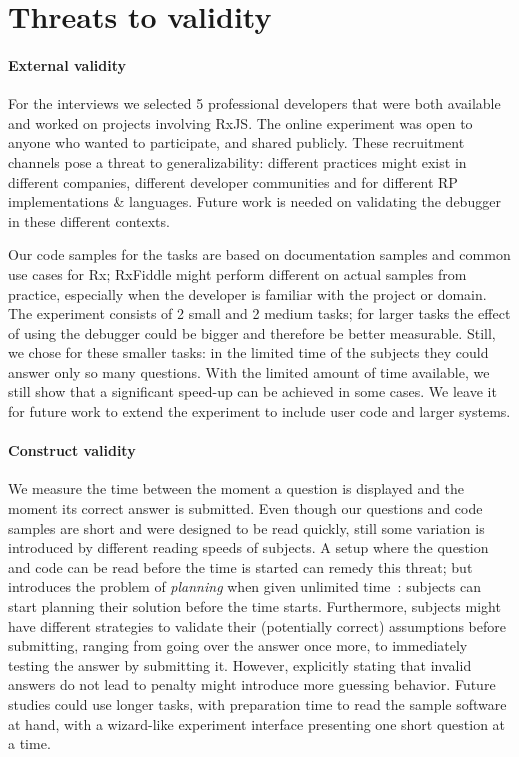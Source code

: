 \vspace{-2mm}
\section{Threats to validity}
\paragraph{External validity} For the interviews we selected 5
professional developers that were both available and worked on projects
involving RxJS.  The online experiment was open to anyone who wanted to
participate, and shared publicly.  These recruitment channels pose a
threat to generalizability:  different practices might exist in
different companies, different developer communities and for different
RP implementations \& languages.  Future work is needed on validating
the debugger in these different contexts.

Our code samples for the tasks are based on documentation samples and
common use cases for Rx; RxFiddle might perform different on actual
samples from practice, especially when the developer is familiar with
the project or domain.  The experiment consists of 2 small and 2 medium
tasks; for larger tasks the effect of using the debugger could be bigger
and therefore be better measurable.  Still, we chose for these smaller
tasks:  in the limited time of the subjects they could answer only so
many questions.  With the limited amount of time available, we still
show that a significant speed-up can be achieved in some cases.  We
leave it for future work to extend the experiment to include user code
and larger systems.

\paragraph{Construct validity} We measure the time between the moment a
question is displayed and the moment its correct answer is submitted.
Even though our questions and code samples are short and were designed
to be read quickly, still some variation is introduced by different
reading speeds of subjects.  A setup where the question and code can be
read before the time is started can remedy this threat; but introduces
the problem of \emph{planning} when given unlimited time~\cite{ko2015practical}:
subjects can start planning their solution before the time starts.
Furthermore, subjects might have different strategies to validate their
(potentially correct) assumptions before submitting, ranging from going
over the answer once more, to immediately testing the answer by
submitting it.  However, explicitly stating that invalid answers do not
lead to penalty might introduce more guessing behavior.  Future studies
could use longer tasks, with preparation time to read the sample
software at hand, with a wizard-like experiment interface presenting one
short question at a time.

